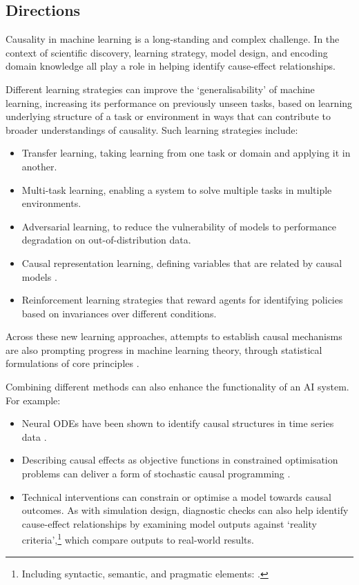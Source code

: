 \subsection{Directions}\label{directions-1}

Causality in machine learning is a long-standing and complex challenge.
In the context of scientific discovery, learning strategy, model design,
and encoding domain knowledge all play a role in helping identify
cause-effect relationships.

Different learning strategies can improve the `generalisability' of
machine learning, increasing its performance on previously unseen tasks,
based on learning underlying structure of a task or environment in ways
that can contribute to broader understandings of causality. Such
learning strategies include:

\begin{itemize}
\item
  Transfer learning, taking learning from one task or domain and
  applying it in another.
\item
  Multi-task learning, enabling a system to solve multiple tasks in
  multiple environments.
\item
  Adversarial learning, to reduce the vulnerability of models to
  performance degradation on out-of-distribution data.
\item
  Causal representation learning, defining variables that are related by
  causal models \cite{Scholkopf-causality22}.
\item
  Reinforcement learning strategies that reward agents for identifying
  policies based on invariances over different conditions.
\end{itemize}

Across these new learning approaches, attempts to establish causal
mechanisms are also prompting progress in machine learning theory,
through statistical formulations of core principles \cite{Guo-causal22}.

Combining different methods can also enhance the functionality of an AI
system. For example:

\begin{itemize}
\item
  Neural ODEs have been shown to identify causal structures in time
  series data \cite{Aliee-beyond21}.
\item
  Describing causal effects as objective functions in constrained
  optimisation problems can deliver a form of stochastic causal
  programming \cite{Padh-stochastic22}.
\item
  Technical interventions \cite{Jakobsen-distributional22}
  can constrain or optimise a model towards causal outcomes. As with
  simulation design, diagnostic checks can also help identify
  cause-effect relationships by examining model outputs against `reality
  criteria',\footnote{Including syntactic, semantic, and pragmatic
    elements: \cite{Stadler-wirklichkeitskriterien90}.} which compare outputs to
  real-world results.
\end{itemize}

